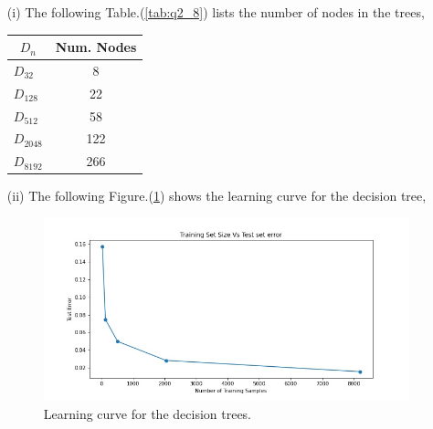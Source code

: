 \documentclass[a4paper]{article}
\theoremstyle{definition}
\newenvironment{soln}{
    \leavevmode\color{blue}\ignorespaces
}{}
\begin{document}
\begin{soln}
  \begin{itemize}
    \item [(i)] The following Table.(\ref{tab:q2_8}) lists the number of nodes in the trees,
    \begin{table}[H]
      \centering
      \begin{tabular}{|l|c|}
      \hline
      \multicolumn{1}{|c|}{$D_n$} & \textbf{Num. Nodes} \\ \hline
      $D_{32}$                               & 8                  \\ \hline
      $D_{128}$                               & 22                   \\ \hline
      $D_{512}$                               & 58                   \\ \hline
      $D_{2048}$                               & 122                  \\ \hline
      $D_{8192}$                               & 266                  \\ \hline
      \end{tabular}
      \end{table}
      \label{tab:q2_8}

      \item [(ii)] The following Figure.(\ref{fig:q2_9}) shows the learning curve for the decision tree,
        \begin{figure}[H]
          \centering
          \includegraphics[width=12cm]{q27_nodes_v_err.jpg}
          \caption{Learning curve for the decision trees.}
          \label{fig:q2_9}
        \end{figure}


\end{itemize}
\end{soln}
\end{document}
